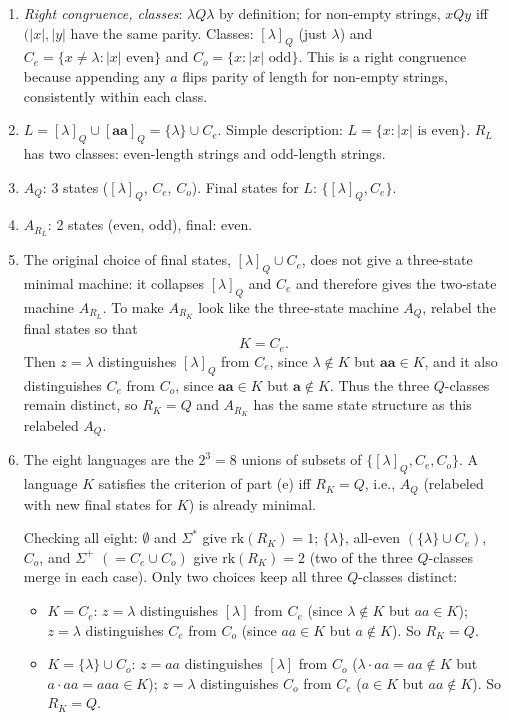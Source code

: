 \begin{enumerate}[{2.}1.]
\begin{enumerate}
\item \textit{Right congruence, classes}: $\lambda Q \lambda$ by definition; for non-empty strings, $x Q y$ iff $(|x|,|y|$ have the same parity. Classes: $[\lambda]_Q$ (just $\lambda$) and $C_e=\{x\neq\lambda:|x|\text{ even}\}$ and $C_o=\{x:|x|\text{ odd}\}$. This is a right congruence because appending any $a$ flips parity of length for non-empty strings, consistently within each class.

\item $L=[\lambda]_Q\cup[\mathbf{aa}]_Q=\{\lambda\}\cup C_e$. Simple description: $L=\{x:|x|\text{ is even}\}$. $R_L$ has two classes: even-length strings and odd-length strings.

\item $A_Q$: 3 states ($[\lambda]_Q$, $C_e$, $C_o$). Final states for $L$: $\{[\lambda]_Q, C_e\}$.

\item $A_{R_L}$: 2 states (even, odd), final: even.

\item The original choice of final states, $[\lambda]_Q\cup C_e$, does not
give a three-state minimal machine: it collapses $[\lambda]_Q$ and $C_e$ and
therefore gives the two-state machine $A_{R_L}$.  To make $A_{R_K}$ look like
the three-state machine $A_Q$, relabel the final states so that
\[
K=C_e.
\]
Then $z=\lambda$ distinguishes $[\lambda]_Q$ from $C_e$, since
$\lambda\notin K$ but $\pmb{aa}\in K$, and it also distinguishes $C_e$ from
$C_o$, since $\pmb{aa}\in K$ but $\pmb{a}\notin K$.  Thus the three
$Q$-classes remain distinct, so $R_K=Q$ and $A_{R_K}$ has the same state
structure as this relabeled $A_Q$.

\item The eight languages are the $2^3=8$ unions of subsets of $\{[\lambda]_Q, C_e, C_o\}$. A language $K$ satisfies the criterion of part (e) iff $R_K = Q$, i.e., $A_Q$ (relabeled with new final states for $K$) is already minimal.

Checking all eight: $\emptyset$ and $\Sigma^*$ give $\mathrm{rk}(R_K)=1$; $\{\lambda\}$, all-even $(\{\lambda\}\cup C_e)$, $C_o$, and $\Sigma^+$ $(=C_e\cup C_o)$ give $\mathrm{rk}(R_K)=2$ (two of the three $Q$-classes merge in each case). Only two choices keep all three $Q$-classes distinct:

\begin{itemize}
\item $K = C_e$: $z=\lambda$ distinguishes $[\lambda]$ from $C_e$ (since $\lambda\notin K$ but $aa\in K$); $z=\lambda$ distinguishes $C_e$ from $C_o$ (since $aa\in K$ but $a\notin K$). So $R_K=Q$.
\item $K = \{\lambda\}\cup C_o$: $z=aa$ distinguishes $[\lambda]$ from $C_o$ ($\lambda\cdot aa=aa\notin K$ but $a\cdot aa=aaa\in K$); $z=\lambda$ distinguishes $C_o$ from $C_e$ ($a\in K$ but $aa\notin K$). So $R_K=Q$.
\end{itemize}


\end{enumerate}
\end{enumerate}
